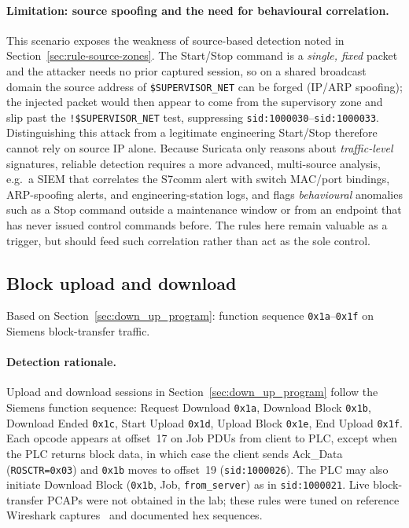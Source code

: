 \documentclass[../main.tex]{subfiles}
\begin{document}
\paragraph{Limitation: source spoofing and the need for behavioural correlation.}
This scenario exposes the weakness of source-based detection noted in Section~\ref{sec:rule-source-zones}. The Start/Stop command is a \emph{single, fixed} packet and the attacker needs no prior captured session, so on a shared broadcast domain the source address of \texttt{\$SUPERVISOR\_NET} can be forged (IP/ARP spoofing); the injected packet would then appear to come from the supervisory zone and slip past the \texttt{!\$SUPERVISOR\_NET} test, suppressing \texttt{sid:1000030}--\texttt{sid:1000033}. Distinguishing this attack from a legitimate engineering Start/Stop therefore cannot rely on source IP alone. Because Suricata only reasons about \emph{traffic-level} signatures, reliable detection requires a more advanced, multi-source analysis, e.g.\ a SIEM that correlates the S7comm alert with switch MAC/port bindings, ARP-spoofing alerts, and engineering-station logs, and flags \emph{behavioural} anomalies such as a Stop command outside a maintenance window or from an endpoint that has never issued control commands before. The rules here remain valuable as a trigger, but should feed such correlation rather than act as the sole control.

\subsection{Block upload and download}
\label{sec:rules-up-download}

Based on Section~\ref{sec:down_up_program}: function sequence \texttt{0x1a}--\texttt{0x1f} on Siemens block-transfer traffic.

\paragraph{Detection rationale.}
Upload and download sessions in Section~\ref{sec:down_up_program} follow the Siemens function sequence: Request Download \texttt{0x1a}, Download Block \texttt{0x1b}, Download Ended \texttt{0x1c}, Start Upload \texttt{0x1d}, Upload Block \texttt{0x1e}, End Upload \texttt{0x1f}. Each opcode appears at offset~17 on Job PDUs from client to PLC, except when the PLC returns block data, in which case the client sends Ack\_Data (\texttt{ROSCTR=0x03}) and \texttt{0x1b} moves to offset~19 (\texttt{sid:1000026}). The PLC may also initiate Download Block (\texttt{0x1b}, Job, \texttt{from\_server}) as in \texttt{sid:1000021}. Live block-transfer PCAPs were not obtained in the lab; these rules were tuned on reference Wireshark captures~\cite{wireshark_s7comm} and documented hex sequences.
\end{document}
